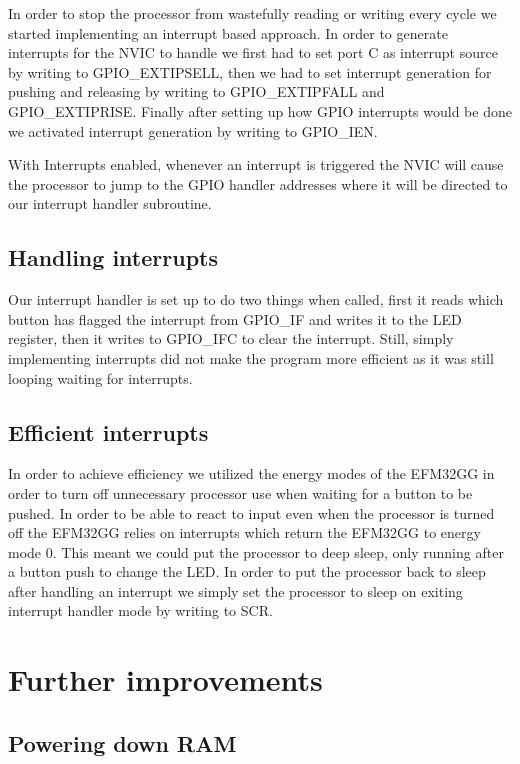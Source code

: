 In order to stop the processor from wastefully reading or writing every cycle we started implementing an interrupt based approach. In order to generate interrupts for the NVIC to handle we first had to set port C as interrupt source by writing to GPIO\_EXTIPSELL,
then we had to set interrupt generation for pushing and releasing by writing to GPIO\_EXTIPFALL and GPIO\_EXTIPRISE. Finally after setting up how GPIO interrupts would be done we activated interrupt generation by writing to GPIO\_IEN.

With Interrupts enabled, whenever an interrupt is triggered the NVIC will cause the processor to jump to the GPIO handler addresses where it will be directed to our interrupt handler subroutine.

\subsection{Handling interrupts}

Our interrupt handler is set up to do two things when called, first it reads which button has flagged the interrupt from GPIO\_IF and writes it to the LED register, then it writes to GPIO\_IFC to clear the interrupt. Still, simply implementing interrupts did not make the program more efficient as it was still looping waiting for interrupts.

\subsection{Efficient interrupts}

In order to achieve efficiency we utilized the energy modes of the EFM32GG in order to turn off unnecessary processor use when waiting for a button to be pushed. In order to be able to react to input even when the processor is turned off the EFM32GG relies on interrupts which return the EFM32GG to energy mode 0. This meant we could put the processor to deep sleep, only running after a button push to change the LED. In order to put the processor back to sleep after handling an interrupt we simply set the processor to sleep on exiting interrupt handler mode by writing to SCR.


\section{Further improvements}

\subsection{Powering down RAM}


